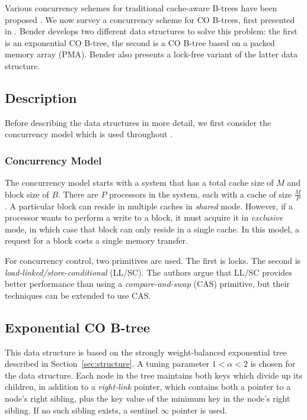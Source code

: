 \documentclass[preprint]{style}
\begin{document}
Various concurrency schemes for traditional cache-aware B-trees have been
proposed \cite{BayerS77, LehmanY81}. We now survey a concurrency scheme for CO
B-trees, first presented in \cite{BenderFiGi05}. Bender develops two different
data structures to solve this problem: the first is an exponential CO B-tree,
the second is a CO B-tree based on a packed memory array (PMA). Bender also
presents a lock-free variant of the latter data structure.

\subsection{Description}

Before describing the data structures in more detail, we first consider
the concurrency model which is used throughout \cite{BenderFiGi05}.

\subsubsection{Concurrency Model}

The concurrency model starts with a system that has a total cache size of $M$
and block size of $B$. There are $P$ processors in the system, each with a
cache of size $\frac{M}{P}$. A particular block can reside in multiple caches
in \textit{shared} mode. However, if a processor wants to perform a write to a
block, it must acquire it in \textit{exclusive} mode, in which case that block
can only reside in a single cache. In this model, a request for a block costs
a single memory transfer.

For concurrency control, two primitives are used. The first is locks. The
second is \textit{load-linked/store-conditional} (LL/SC). The authors argue
that LL/SC provides better performance than using a \textit{compare-and-swap}
(CAS) primitive, but their techniques can be extended to use CAS.

\subsection{Exponential CO B-tree}

This data structure is based on the strongly weight-balanced exponential tree
described in Section~\ref{sec:structure}. A tuning parameter $1 < \alpha < 2$
is chosen for the data structure. Each node in the tree maintains both keys
which divide up its children, in addition to a \textit{right-link} pointer,
which contains both a pointer to a node's right sibling, plus the key value of
the minimum key in the node's right sibling. If no such sibling exists, a
sentinel $\infty$ pointer is used.
\end{document}
